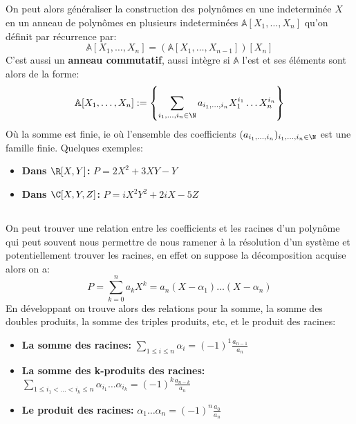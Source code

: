 \subsection*{}
On peut alors généraliser la construction des polynômes en une indeterminée \( X \) en un anneau de polynômes en plusieurs indeterminées \( \mathbb{A}[X_1, \ldots, X_n] \) qu'on définit par récurrence par:
\[ 
   \mathbb{A}[X_1, \ldots, X_n] =    \left( \mathbb{A}[X_1, \ldots, X_{n-1}] \right)[X_n]
\]
C'est aussi un \textbf{anneau commutatif}, aussi intègre si \( \mathbb{A} \) l'est et ses éléments sont alors de la forme:
\[ 
   \mathbb{A}[X_1, \ldots, X_n] := \left\{ \sum_{i_1, \ldots, i_n \in \N} a_{i_1, \ldots, i_n}X_1^{i_1} \ldots X_n^{i_n}\right\}  
\]
Où la somme est finie, ie où l'ensemble des coefficients \( (a_{i_1, \ldots, i_n})_{i_1, \ldots, i_n \in \N} \) est une famille finie. Quelques exemples:
\begin{itemize}
   \item \textbf{Dans \( \R[X, Y] \):} \( P = 2X^2 + 3XY - Y \)
   \item \textbf{Dans \( \C[X, Y, Z] \):} \( P = iX^2Y^2 + 2iX - 5Z \)
\end{itemize}
\subsection*{}
On peut trouver une relation entre les coefficients et les racines d'un polynôme qui peut souvent nous permettre de nous ramener à la résolution d'un système et potentiellement trouver les racines, en effet on suppose la décomposition acquise alors on a:
\[ 
   P = \sum_{k=0}^n a_kX^k = a_n(X - \alpha_1) \ldots (X - \alpha_n)
\]
En développant on trouve alors des relations pour la somme, la somme des doubles produits, la somme des triples produits, etc, et le produit des racines:
\begin{itemize}
   \item \textbf{La somme des racines: } \(\sum_{1 \leq i \leq n} \alpha_i = (-1)^1 \frac{a_{n-1}}{a_n} \)
   \item \textbf{La somme des k-produits des racines: } \( \sum_{1 \leq i_1 < \ldots < i_k \leq n} \alpha_{i_1} \ldots \alpha_{i_k} = (-1)^k \frac{a_{n-k}}{a_n} \)
   \item \textbf{Le produit des racines: } \(\alpha_1 \ldots \alpha_n = (-1)^n \frac{a_0}{a_n} \)
\end{itemize}